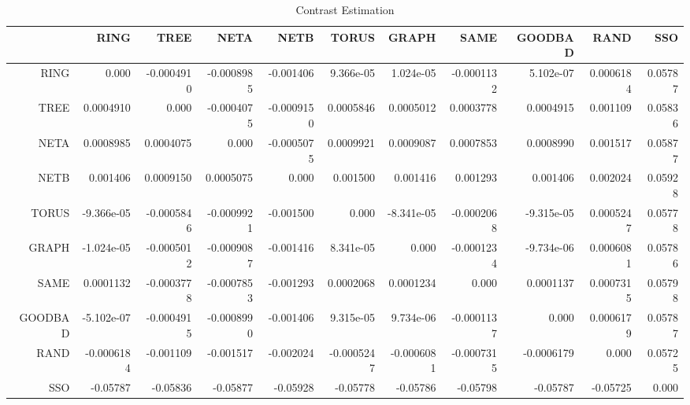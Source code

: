 \documentclass[a4paper,10pt]{article}
\begin{document}
\begin{landscape}
\begin{table}[!htp]
\centering\tiny
\caption{Contrast Estimation}
\begin{tabular}{
|r|r|r|r|r|r|r|r|r|r|r|}
\hline
 & RING& TREE& NETA& NETB& TORUS& GRAPH& SAME& GOODBAD& RAND& SSO\\
\hline
 RING&0.000&-0.0004910&-0.0008985&-0.001406&9.366e-05&1.024e-05&-0.0001132&5.102e-07&0.0006184&0.05787\\
\hline
 TREE&0.0004910&0.000&-0.0004075&-0.0009150&0.0005846&0.0005012&0.0003778&0.0004915&0.001109&0.05836\\
\hline
 NETA&0.0008985&0.0004075&0.000&-0.0005075&0.0009921&0.0009087&0.0007853&0.0008990&0.001517&0.05877\\
\hline
 NETB&0.001406&0.0009150&0.0005075&0.000&0.001500&0.001416&0.001293&0.001406&0.002024&0.05928\\
\hline
 TORUS&-9.366e-05&-0.0005846&-0.0009921&-0.001500&0.000&-8.341e-05&-0.0002068&-9.315e-05&0.0005247&0.05778\\
\hline
 GRAPH&-1.024e-05&-0.0005012&-0.0009087&-0.001416&8.341e-05&0.000&-0.0001234&-9.734e-06&0.0006081&0.05786\\
\hline
 SAME&0.0001132&-0.0003778&-0.0007853&-0.001293&0.0002068&0.0001234&0.000&0.0001137&0.0007315&0.05798\\
\hline
 GOODBAD&-5.102e-07&-0.0004915&-0.0008990&-0.001406&9.315e-05&9.734e-06&-0.0001137&0.000&0.0006179&0.05787\\
\hline
 RAND&-0.0006184&-0.001109&-0.001517&-0.002024&-0.0005247&-0.0006081&-0.0007315&-0.0006179&0.000&0.05725\\
\hline
 SSO&-0.05787&-0.05836&-0.05877&-0.05928&-0.05778&-0.05786&-0.05798&-0.05787&-0.05725&0.000\\
\hline

\end{tabular}
\end{table}

\newpage


\end{landscape}
\end{document}
